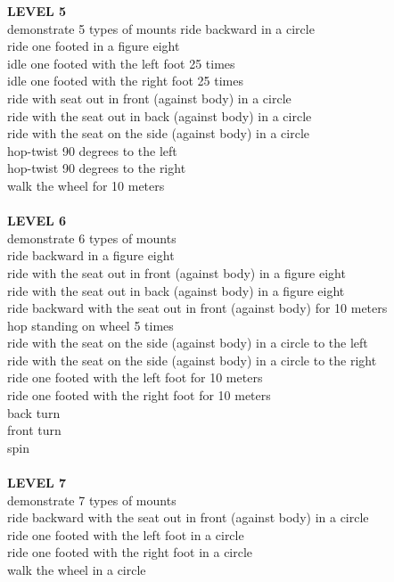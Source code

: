 \textbf{LEVEL 5}\\
demonstrate 5 types of mounts ride backward in a circle\\
ride one footed in a figure eight\\
idle one footed with the left foot 25 times\\
idle one footed with the right foot 25 times\\
ride with seat out in front (against body) in a circle\\
ride with the seat out in back (against body) in a circle\\
ride with the seat on the side (against body) in a circle\\
hop-twist 90 degrees to the left\\
hop-twist 90 degrees to the right\\
walk the wheel for 10 meters \\
\\
\textbf{LEVEL 6}\\
demonstrate 6 types of mounts\\
ride backward in a figure eight\\
ride with the seat out in front (against body) in a figure eight\\
ride with the seat out in back (against body) in a figure eight\\
ride backward with the seat out in front (against body) for 10 meters\\
hop standing on wheel 5 times\\
ride with the seat on the side (against body) in a circle to the left\\
ride with the seat on the side (against body) in a circle to the right\\
ride one footed with the left foot for 10 meters\\
ride one footed with the right foot for 10 meters\\
back turn\\
front turn\\
spin \\\\
\textbf{LEVEL 7}\\
demonstrate 7 types of mounts\\
ride backward with the seat out in front (against body) in a circle\\
ride one footed with the left foot in a circle\\
ride one footed with the right foot in a circle\\
walk the wheel in a circle\\
